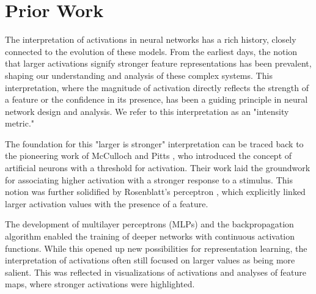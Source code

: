 \section{Prior Work}

The interpretation of activations in neural networks has a rich history, closely connected to the evolution of these models. \cite{lecun1998gradient} From the earliest days, the notion that larger activations signify stronger feature representations has been prevalent, shaping our understanding and analysis of these complex systems. \cite{erhan2009visualizing, lecun1998gradient,  mcculloch1943logical, rosenblatt1958perceptron,  rumelhart1986learning} This interpretation, where the magnitude of activation directly reflects the strength of a feature or the confidence in its presence, has been a guiding principle in neural network design and analysis. \cite{zeiler2014visualizing,yosinski2015understanding,olah2017feature}  We refer to this interpretation as an "intensity metric." \cite{simonyan2013deep}

The foundation for this "larger is stronger" interpretation can be traced back to the pioneering work of McCulloch and Pitts \cite{mcculloch1943logical}, who introduced the concept of artificial neurons with a threshold for activation. \cite{erhan2009visualizing, lecun1998gradient, mcculloch1943logical, rosenblatt1958perceptron, rumelhart1986learning} Their work laid the groundwork for associating higher activation with a stronger response to a stimulus. \cite{rosenblatt1958perceptron, rumelhart1986learning, lecun1998gradient} This notion was further solidified by Rosenblatt's perceptron \cite{rosenblatt1958perceptron}, which explicitly linked larger activation values with the presence of a feature. \cite{rosenblatt1958perceptron,olah2017feature}

The development of multilayer perceptrons (MLPs) and the backpropagation algorithm \cite{rumelhart1986learning} enabled the training of deeper networks with continuous activation functions. \cite{lecun1989backpropagation,hornik1989multilayer,glorot2011deep} While this opened up new possibilities for representation learning, the interpretation of activations often still focused on larger values as being more salient. \cite{lecun1989backpropagation,hornik1989multilayer,glorot2011deep} This was reflected in visualizations of activations and analyses of feature maps, where stronger activations were highlighted. \cite{zeiler2014visualizing,yosinski2015understanding}

